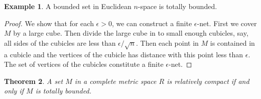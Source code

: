 \documentclass[a4paper,12pt]{article}
\newtheorem{thm}{Theorem}[section]
\theoremstyle{definition}
\newtheorem{expl}[thm]{Example}
\theoremstyle{remark}
\begin{document}
\begin{expl}
  A bounded set in Euclidean $n$-space is totally bounded.
\end{expl}
\begin{proof}
  We show that for each $\epsilon > 0$, we can construct a finite $\epsilon$-net. First we cover $M$ by a large cube. Then divide the large cube in to small enough cubicles, say, all sides of the cubicles are less than $\epsilon/\sqrt{n}$. Then each point in $M$ is contained in a cubicle and the vertices of the cubicle has distance with this point less than $\epsilon$. The set of vertices of the cubicles constitute a finite $\epsilon$-net.
\end{proof}

\begin{thm}
  A set $M$ in a complete metric space $R$ is relatively compact if and only if $M$ is totally bounded.
\end{thm}
\end{document}
